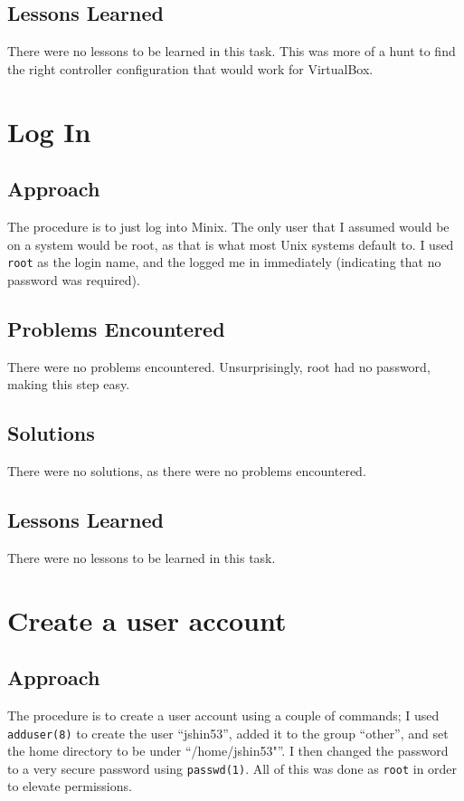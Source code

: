 \documentclass[11pt]{article}
\begin{document}
\subsection{Lessons Learned}
There were no lessons to be learned in this task. This was more of a hunt to find the right controller configuration that would work for {\sc VirtualBox}.

\section{Log In}
\subsection{Approach}
The procedure is to just log into {\sc Minix}. The only user that I assumed would be on a system would be root, as that is what most Unix systems default to. I used {\tt root} as the login name, and the logged me in immediately (indicating that no password was required).

\subsection{Problems Encountered}
There were no problems encountered. Unsurprisingly, root had no password, making this step easy.

\subsection{Solutions}
There were no solutions, as there were no problems encountered.

\subsection{Lessons Learned}
There were no lessons to be learned in this task.

\section{Create a user account}
\subsection{Approach}
The procedure is to create a user account using a couple of commands; I used {\tt adduser(8)} to create the user ``jshin53'', added it to the group ``other'', and set the home directory to be under ``/home/jshin53"''. I then changed the password to a very secure password using {\tt passwd(1)}. All of this was done as {\tt root} in order to elevate permissions.
\end{document}
